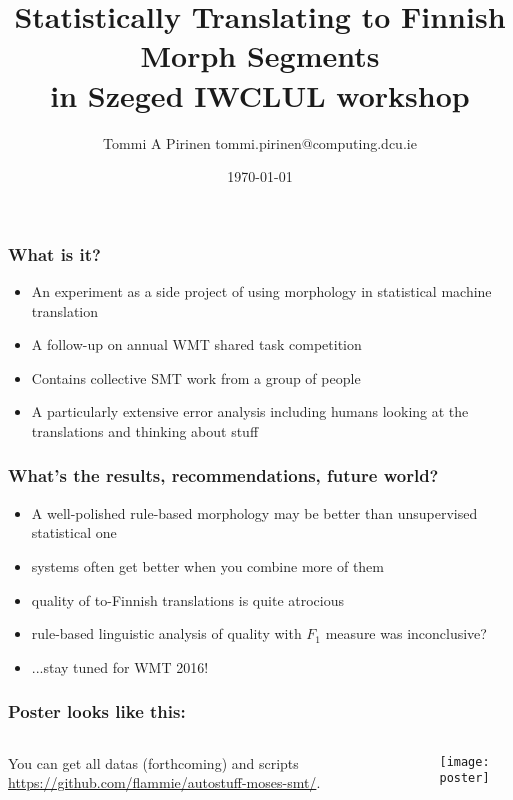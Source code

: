 \documentclass{beamer}
\title{Statistically Translating to Finnish Morph Segments\\
\scriptsize{in Szeged IWCLUL workshop}}
\author{Tommi A Pirinen \scriptsize \guilsinglleft{}tommi.pirinen@computing.dcu.ie\guilsinglright{}}
\institute{Ollscoil Chathair Bhaile Átha Cliath, ADAPT Centre\\
EU Marie Curie Abu-MaTran project}
\date{\today}
\begin{document}

\maketitle

\begin{frame}
    \frametitle{What is it?}
    \begin{itemize}
        \item An experiment as a side project of using morphology in statistical
            machine translation
        \item A follow-up on annual WMT shared task competition
        \item Contains collective SMT work from a group of people
        \item A particularly extensive error analysis including humans looking
            at the translations and thinking about stuff
    \end{itemize}
\end{frame}


\begin{frame}
    \frametitle{What's the results, recommendations, future world?}
    \begin{itemize}
        \item A well-polished rule-based morphology may be better than
            unsupervised statistical one
        \item systems often get better when you combine more of them
        \item quality of to-Finnish translations is quite atrocious
        \item rule-based linguistic analysis of quality with $F_1$ measure
            was inconclusive?
        \item ...stay tuned for WMT 2016!
    \end{itemize}
\end{frame}

\begin{frame}
    \frametitle{Poster looks like this:}
    \begin{minipage}[0.2\textheight]{\textwidth}
\begin{columns}[T]
\begin{column}{0.8\textwidth}
    You can get all datas (forthcoming) and scripts \url{https://github.com/flammie/autostuff-moses-smt/}.
\end{column}
\begin{column}{0.2\textwidth}
    \texttt{[image: poster]}
\end{column}
\end{columns}
\end{minipage}
\end{frame}
\end{document}
